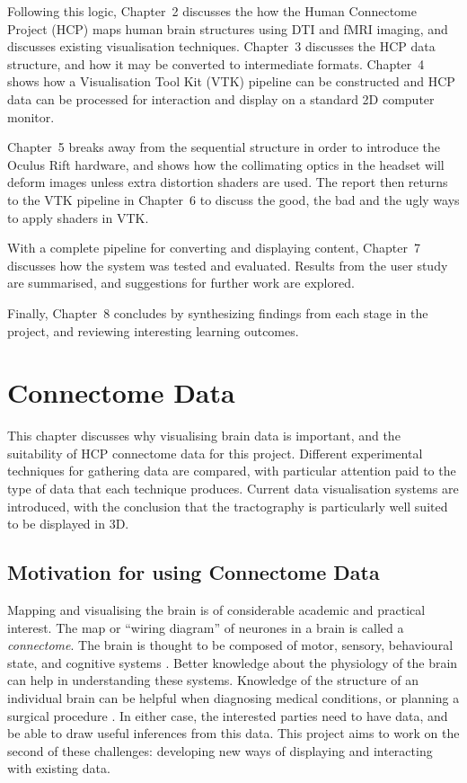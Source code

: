 \documentclass[MSc,paper=a4,pagesize=auto]{icldt}
\begin{document}
Following this logic, Chapter~2 discusses the how the Human Connectome Project (HCP) maps human brain structures using DTI and fMRI imaging, and discusses existing visualisation techniques. Chapter~3 discusses the HCP data structure, and how it may be converted to intermediate formats. Chapter~4 shows how a Visualisation Tool Kit (VTK) pipeline can be constructed and HCP data can be processed for interaction and display on a standard 2D computer monitor. 

Chapter~5 breaks away from the sequential structure in order to introduce the Oculus Rift hardware, and shows how the collimating optics in the headset will deform images unless extra distortion shaders are used. The report then returns to the VTK pipeline in Chapter~6 to discuss the good, the bad and the ugly ways to apply shaders in VTK. 

With a complete pipeline for converting and displaying content, Chapter~7 discusses how the system was tested and evaluated. Results from the user study are summarised, and suggestions for further work are explored.

Finally, Chapter~8 concludes by synthesizing findings from each stage in the project, and reviewing interesting learning outcomes.

\chapter{Connectome Data}

This chapter discusses why visualising brain data is important, and the suitability of HCP connectome data for this project. Different experimental techniques for gathering data are compared, with particular attention paid to the type of data that each technique produces. Current data visualisation systems are introduced, with the conclusion that the tractography is particularly well suited to be displayed in 3D. 

\clearpage
\section{Motivation for using Connectome Data}
Mapping and visualising the brain is of considerable academic and practical interest. The map or ``wiring diagram'' of neurones in a brain is called a \textit{connectome}. The brain is thought to be composed of motor, sensory, behavioural state, and cognitive systems \cite{Swanson2003}. Better knowledge about the physiology of the brain can help in understanding these systems. Knowledge of the structure of an individual brain can be helpful when diagnosing medical conditions, or planning a surgical procedure \cite{Golby2011}. In either case, the interested parties need to have data, and be able to draw useful inferences from this data. This project aims to work on the second of these challenges: developing new ways of displaying and interacting with existing data. 
\end{document}
